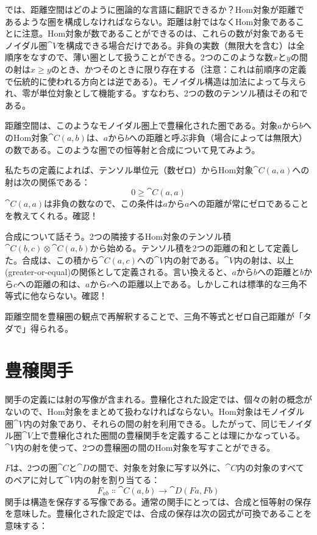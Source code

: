 では、距離空間はどのように圏論的な言語に翻訳できるか？Hom対象が距離であるような圏を構成しなければならない。距離は射ではなくHom対象であることに注意。Hom対象が数であることができるのは、これらの数が対象であるモノイダル圏$\cat{V}$を構成できる場合だけである。非負の実数（無限大を含む）は全順序をなすので、薄い圏として扱うことができる。2つのこのような数$x$と$y$の間の射は$x \geqslant y$のとき、かつそのときに限り存在する（注意：これは前順序の定義で伝統的に使われる方向とは逆である）。モノイダル構造は加法によって与えられ、零が単位対象として機能する。すなわち、2つの数のテンソル積はその和である。

距離空間は、このようなモノイダル圏上で豊穣化された圏である。対象$a$から$b$へのHom対象$\cat{C}(a, b)$は、$a$から$b$への距離と呼ぶ非負（場合によっては無限大）の数である。このような圏での恒等射と合成について見てみよう。

私たちの定義によれば、テンソル単位元（数ゼロ）からHom対象$\cat{C}(a, a)$への射は次の関係である：
\[0 \geqslant \cat{C}(a, a)\]
$\cat{C}(a, a)$は非負の数なので、この条件は$a$から$a$への距離が常にゼロであることを教えてくれる。確認！

合成について話そう。2つの隣接するHom対象のテンソル積$\cat{C}(b, c) \otimes \cat{C}(a, b)$から始める。テンソル積を2つの距離の和として定義した。合成は、この積から$\cat{C}(a, c)$への$\cat{V}$内の射である。$\cat{V}$内の射は、以上(greater-or-equal)の関係として定義される。言い換えると、$a$から$b$への距離と$b$から$c$への距離の和は、$a$から$c$への距離以上である。しかしこれは標準的な三角不等式に他ならない。確認！

距離空間を豊穣圏の観点で再解釈することで、三角不等式とゼロ自己距離が「タダで」得られる。

\section{豊穣関手}

関手の定義には射の写像が含まれる。豊穣化された設定では、個々の射の概念がないので、Hom対象をまとめて扱わなければならない。Hom対象はモノイダル圏$\cat{V}$内の対象であり、それらの間の射を利用できる。したがって、同じモノイダル圏$\cat{V}$上で豊穣化された圏間の豊穣関手を定義することは理にかなっている。$\cat{V}$内の射を使って、2つの豊穣圏の間のHom対象を写すことができる。

 $F$は、2つの圏$\cat{C}$と$\cat{D}$の間で、対象を対象に写す以外に、$\cat{C}$内の対象のすべてのペアに対して$\cat{V}$内の射を割り当てる：
\[F_{a b} \Colon \cat{C}(a, b) \to \cat{D}(F a, F b)\]
関手は構造を保存する写像である。通常の関手にとっては、合成と恒等射の保存を意味した。豊穣化された設定では、合成の保存は次の図式が可換であることを意味する：

